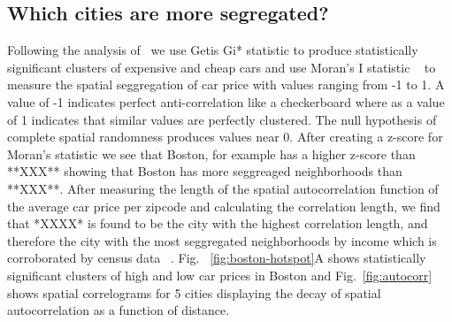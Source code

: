 \documentclass[10pt,twocolumn,letterpaper]{article}
\begin{document}
\subsection{Which cities are more segregated?}
Following the analysis of~\cite{mit_plos_1} we use Getis Gi* statistic to produce statistically significant clusters of expensive and cheap cars and use Moran's I statistic ~\cite{moran} to measure the spatial seggregation of car price with values ranging from -1 to 1. A value of -1 indicates perfect anti-correlation like a checkerboard where as a value of 1 indicates that similar values are perfectly clustered. The null hypothesis of complete spatial randomness produces values near 0. After creating a z-score for Moran's statistic we see that Boston, for example has a higher z-score than **XXX** showing that Boston has more seggreaged neighborhoods than **XXX**. After measuring the length of the spatial autocorrelation function of the average car price per zipcode and calculating the correlation length, we find that *XXXX* is found to be the city with the highest correlation length, and therefore the city with the most seggregated neighborhoods by income which is corroborated by census data ~\cite{census-segreggation}. Fig. ~\ref{fig:boston-hotspot}A shows statistically significant clusters of high and low car prices in Boston and Fig.~\ref{fig:autocorr} shows spatial correlograms for 5 cities displaying the decay of spatial autocorrelation as a function of distance.
\end{document}
